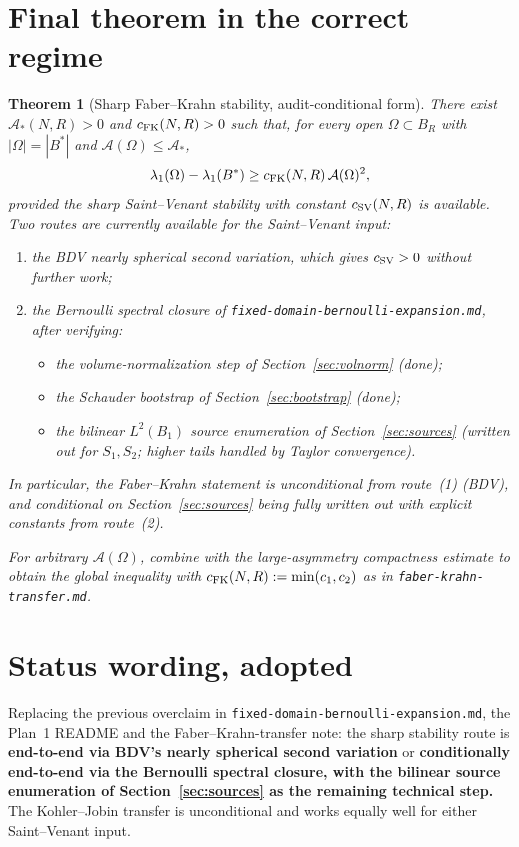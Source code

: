 \documentclass[11pt]{article}
\newtheorem{theorem}{Theorem}
\theoremstyle{definition}
\newcommand{\abs}[1]{\left|#1\right|}
\begin{document}
\section{Final theorem in the correct regime}\label{sec:finaltheorem}

\begin{theorem}[Sharp Faber--Krahn stability, audit-conditional form]\label{thm:final}
There exist $\mathcal A_*(N,R)>0$ and $c_{\rm FK}(N,R)>0$ such that, for every
open $\Omega\subset B_R$ with $\abs{\Omega}=\abs{B^*}$ and
$\mathcal A(\Omega)\le\mathcal A_*$,
\[
\lambda_1(\Omega)-\lambda_1(B^*)\ge c_{\rm FK}(N,R)\,\mathcal A(\Omega)^2,
\]
\emph{provided} the sharp Saint--Venant stability with constant $c_{\rm SV}(N,R)$
is available. Two routes are currently available for the Saint--Venant
input:
\begin{enumerate}
\item the BDV nearly spherical second variation, which gives $c_{\rm SV}>0$
without further work;
\item the Bernoulli spectral closure of
\texttt{fixed-domain-bernoulli-expansion.md}, after verifying:
\begin{itemize}
\item the volume-normalization step of Section~\ref{sec:volnorm} (done);
\item the Schauder bootstrap of Section~\ref{sec:bootstrap} (done);
\item the bilinear $L^2(B_1)$ source enumeration of Section~\ref{sec:sources}
(written out for $S_1, S_2$; higher tails handled by Taylor convergence).
\end{itemize}
\end{enumerate}

In particular, the Faber--Krahn statement is \emph{unconditional} from
route~(1) (BDV), and \emph{conditional on Section~\ref{sec:sources} being
fully written out with explicit constants} from route~(2).

For arbitrary $\mathcal A(\Omega)$, combine with the large-asymmetry
compactness estimate to obtain the global inequality with
$c_{\rm FK}(N,R):=\min(c_1,c_2)$ as in
\texttt{faber-krahn-transfer.md}.
\end{theorem}

\section{Status wording, adopted}

Replacing the previous overclaim in
\texttt{fixed-domain-bernoulli-expansion.md}, the Plan~1 README and the
Faber--Krahn-transfer note: the sharp stability route is
\textbf{end-to-end via BDV's nearly spherical second variation} or
\textbf{conditionally end-to-end via the Bernoulli spectral closure, with
the bilinear source enumeration of Section~\ref{sec:sources} as the
remaining technical step.} The Kohler--Jobin transfer is unconditional and
works equally well for either Saint--Venant input.
\end{document}
